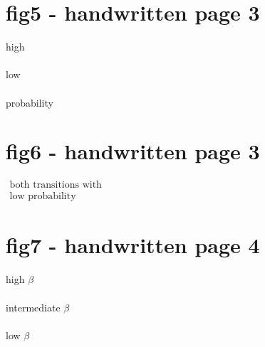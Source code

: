 \documentclass[a4paper,11pt]{article}
\begin{document}
\section{fig5 - handwritten page 3}
high \\\\
low \\\\
probability

\section{fig6 - handwritten page 3}
$\substack{	\text{both transitions with} \\
		\text{low probability}}$

\section{fig7 - handwritten page 4}
high $\beta$ \\\\
intermediate $\beta$ \\\\
low $\beta$
\end{document}
